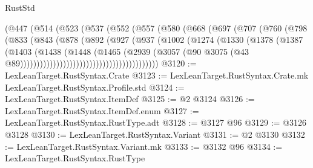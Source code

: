 \begin{lexlean}{RustStd}
\begin{coremodule}
{\begin{coremodule}
{{{{{{{{{{{{{{{{{{{{{{{{{{{{{{{{{{{{{{{{{{{{{                          (@447
                            (@514
                              (@523
                                (@537
                                  (@552
                                    (@557
                                      (@580
                                        (@668
                                          (@697
                                            (@707
                                              (@760
                                                (@798
                                                  (@833
                                                    (@843
                                                      (@878
                                                        (@892
                                                          (@927
                                                            (@937
                                                              (@1002
                                                                (@1274
                                                                  (@1330
                                                                    (@1378
                                                                      (@1387
                                                                        (@1403
                                                                          (@1438
                                                                            (@1448
                                                                              (@1465
                                                                                (@2939
                                                                                  (@3057
                                                                                    (@90
                                                                                      @3075
                                                                                      (@43
                                                                                        @89))))))))))))))))))))))))))))))))))))))))))
@3120 := LexLeanTarget.RustSyntax.Crate
@3123 := LexLeanTarget.RustSyntax.Crate.mk LexLeanTarget.RustSyntax.Profile.std
@3124 := LexLeanTarget.RustSyntax.ItemDef
@3125 := @2 @3124
@3126 := LexLeanTarget.RustSyntax.ItemDef.enum
@3127 := LexLeanTarget.RustSyntax.RustType.adt
@3128 := @3127 @96
@3129 := @3126 @3128
@3130 := LexLeanTarget.RustSyntax.Variant
@3131 := @2 @3130
@3132 := LexLeanTarget.RustSyntax.Variant.mk
@3133 := @3132 @96
@3134 := LexLeanTarget.RustSyntax.RustType
}}}}}}}}}}}}}}}}}}}}}}}}}}}}}}}}}}}}}}}}}}}}}
\end{coremodule}}
\end{coremodule}
\end{lexlean}
